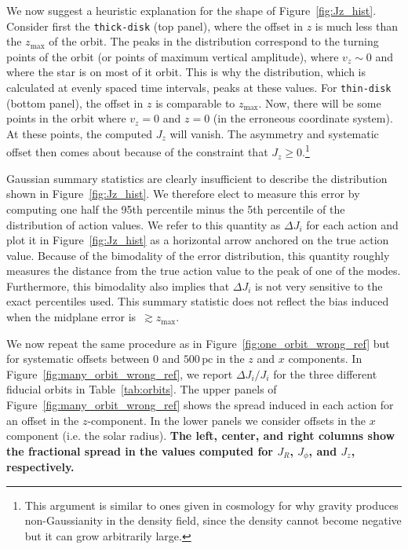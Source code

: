\documentclass[twocolumn]{aastex62}
\newcommand{\pc}{\text{pc}}
\newcommand{\thin}{\texttt{thin-disk}}
\newcommand{\thick}{\texttt{thick-disk}}
\begin{document}
We now suggest a heuristic explanation for the shape of
Figure~\ref{fig:Jz_hist}. Consider first the \thick{} (top panel), where the
offset in $z$ is much less than the $z_{\text{max}}$ of the orbit. The peaks
in the distribution correspond to the turning points of the orbit (or points
of maximum vertical amplitude), where $v_z \sim 0$ and where the star is on
most of it orbit. This is why the distribution, which is calculated at evenly
spaced time intervals, peaks at these values. For \thin{} (bottom panel), the
offset in $z$ is comparable to $z_{\text{max}}$. Now, there will be some
points in the orbit where $v_z = 0$ and $z=0$ (in the erroneous coordinate
system). At these points, the computed $J_z$ will vanish. The asymmetry and
systematic offset then comes about because of the constraint that $J_z \geq
0$.\footnote{This argument is similar to ones given in cosmology for why
gravity produces non-Gaussianity in the density field, since the density
cannot become negative but it can grow arbitrarily large.}

Gaussian summary statistics are clearly insufficient to describe the
distribution shown in Figure~\ref{fig:Jz_hist}. We therefore elect to measure
this error by computing one half the 95th percentile minus the 5th percentile
of the distribution of action values. We refer to this quantity as $\Delta
J_i$ for each action and plot it in Figure~\ref{fig:Jz_hist} as a horizontal
arrow anchored on the true action value. Because of the bimodality of the
error distribution, this quantity roughly measures the distance from the true
action value to the peak of one of the modes. Furthermore, this bimodality
also implies that $\Delta J_i$ is not very sensitive to the exact percentiles
used. This summary statistic does not reflect the bias induced when the
midplane error is~$\gtrsim z_{\text{max}}$.

We now repeat the same procedure as in Figure~\ref{fig:one_orbit_wrong_ref}
but for systematic offsets between $0$ and $500\,\pc$ in the $z$ and $x$
components. In Figure~\ref{fig:many_orbit_wrong_ref}, we report $\Delta
J_i/J_i$ for the three different fiducial orbits in Table~\ref{tab:orbits}.
The upper panels of Figure~\ref{fig:many_orbit_wrong_ref} shows the spread
induced in each action for an offset in the $z$-component. In the lower panels
we consider offsets in the $x$ component (i.e. the solar radius). \textbf{The left,
center, and right columns show the fractional spread in the values computed
for $J_R$, $J_{\phi}$, and $J_z$, respectively.}
\end{document}
